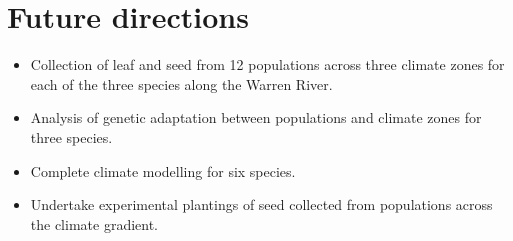 \documentclass[version=last, paper=a4, DIV=18, usenames, dvipsnames]{scrartcl}
\begin{document}
\section{Future directions}



\begin{itemize}

  \item Collection of leaf and seed from 12 populations across three climate zones for each of the three species along the Warren River.

  \item Analysis of genetic adaptation between populations and climate zones for three species.

  \item Complete climate modelling for six species.

  \item Undertake experimental plantings of seed collected from populations across the climate gradient.

\end{itemize}






\clearpage
\end{document}
